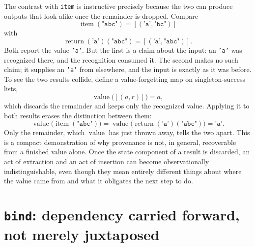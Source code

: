 \documentclass[11pt]{article}
\begin{document}
The contrast with \texttt{item} is instructive precisely because the two can produce outputs that look alike once the remainder is dropped. Compare
\[
\operatorname{item}(\texttt{"abc"}) = [(\texttt{'a'}, \texttt{"bc"})]
\]
with
\[
\operatorname{return}(\texttt{'a'})(\texttt{"abc"}) = [(\texttt{'a'}, \texttt{"abc"})].
\]
Both report the value \texttt{'a'}. But the first is a claim about the input: an \texttt{'a'} was recognized there, and the recognition consumed it. The second makes no such claim; it supplies an \texttt{'a'} from elsewhere, and the input is exactly as it was before. To see the two results collide, define a value-forgetting map on singleton-success lists,
\[
\operatorname{value}\bigl([(a, r)]\bigr) = a,
\]
which discards the remainder and keeps only the recognized value. Applying it to both results erases the distinction between them:
\[
\operatorname{value}\bigl(\operatorname{item}(\texttt{"abc"})\bigr) = \operatorname{value}\bigl(\operatorname{return}(\texttt{'a'})(\texttt{"abc"})\bigr) = \texttt{'a'}.
\]
Only the remainder, which $\operatorname{value}$ has just thrown away, tells the two apart. This is a compact demonstration of why provenance is not, in general, recoverable from a finished value alone. Once the state component of a result is discarded, an act of extraction and an act of insertion can become observationally indistinguishable, even though they mean entirely different things about where the value came from and what it obligates the next step to do.

\section{\texttt{bind}: dependency carried forward, not merely juxtaposed}
\end{document}
